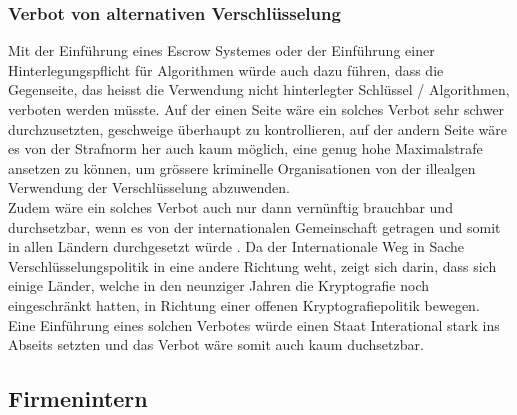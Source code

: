	
	\subsubsection{Verbot von alternativen Verschlüsselung}
Mit der Einführung eines Escrow Systemes oder der Einführung einer Hinterlegungspflicht für Algorithmen würde auch dazu führen, dass die Gegenseite, das heisst die Verwendung nicht hinterlegter Schlüssel / Algorithmen, verboten werden müsste. Auf der einen Seite wäre ein solches Verbot sehr schwer durchzusetzten, geschweige überhaupt zu kontrollieren, auf der andern Seite wäre es von der Strafnorm her auch kaum möglich, eine genug hohe Maximalstrafe ansetzen zu können, um grössere kriminelle Organisationen von der illealgen Verwendung der Verschlüsselung abzuwenden. \cite{BUND KP 7.3.} \\
Zudem wäre ein solches Verbot auch nur dann vernünftig brauchbar und durchsetzbar, wenn es von der internationalen Gemeinschaft getragen und somit in allen Ländern durchgesetzt würde \cite{GREGG}. Da der Internationale Weg in Sache Verschlüsselungspolitik in eine andere Richtung weht, zeigt sich darin, dass sich einige Länder, welche in den neunziger Jahren die Kryptografie noch eingeschränkt hatten, in Richtung einer offenen Kryptografiepolitik bewegen. \cite{EPIC} \cite{BUND 7.2.3} \\
Eine Einführung eines solchen Verbotes würde einen Staat Interational stark ins Abseits setzten und das Verbot wäre somit auch kaum duchsetzbar.
		
	\subsection{Firmenintern}
